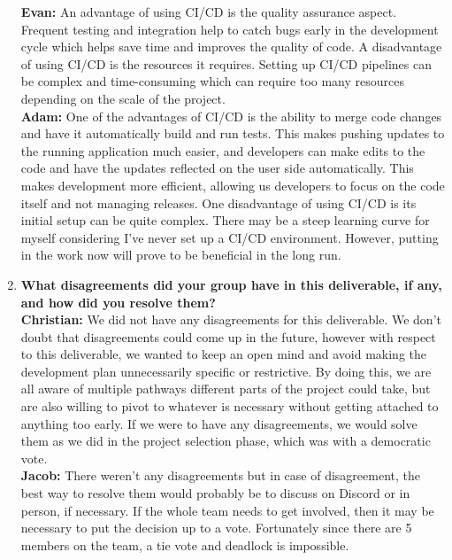 \documentclass{article}
\begin{document}
\begin{enumerate}
  \textbf{Evan:} An advantage of using CI/CD is the quality assurance aspect. Frequent testing and integration help to catch bugs early in the development cycle which helps save time and improves the quality of code. A disadvantage of using CI/CD is the resources it requires. Setting up CI/CD pipelines can be complex and time-consuming which can require too many resources depending on the scale of the project. \\

  \textbf{Adam:} One of the advantages of  CI/CD is the ability to merge code changes and have it automatically build and run tests. This makes pushing updates to the running application much easier, and developers can make edits to the code and have the updates reflected on the user side automatically. This makes development more efficient, allowing us developers to focus on the code itself and not managing releases. One disadvantage of using CI/CD is its initial setup can be quite complex. There may be a steep learning curve for myself considering I've never set up a CI/CD environment. However, putting in the work now will prove to be beneficial in the long run.\\
  
  \item \textbf{What disagreements did your group have in this deliverable, if any, and how did you resolve them?}\\

  \textbf{Christian:} We did not have any disagreements for this deliverable. We don't doubt that disagreements could come up in the future, however with respect to this deliverable, we wanted to keep an open mind and avoid making the development plan unnecessarily specific or restrictive. By doing this, we are all aware of multiple pathways different parts of the project could take, but are also willing to pivot to whatever is necessary without getting attached to anything too early. If we were to have any disagreements, we would solve them as we did in the project selection phase, which was with a democratic vote.\\

  \textbf{Jacob:}  There weren’t any disagreements but in case of disagreement, the best way to resolve them would probably be to discuss on Discord or in person, if necessary. If the whole team needs to get involved, then it may be necessary to put the decision up to a vote. Fortunately since there are 5 members on the team, a tie vote and deadlock is impossible.\\


\end{enumerate}
\end{document}
